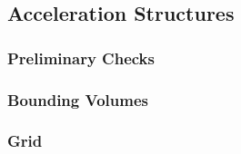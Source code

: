 \documentclass[final]{cmpreport}
\begin{document}
\subsection{Acceleration Structures}

\subsubsection{Preliminary Checks}

\subsubsection{Bounding Volumes}

\subsubsection{Grid}
\end{document}
